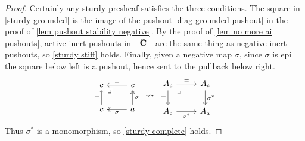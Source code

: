 \documentclass{amsart}
\makeatletter
\newcommand{\contr}{\mathbf{C}}
\newcommand*\wt[1]{\mathpalette\wthelper{#1}}
\newcommand*\wthelper[2]{%
        \hbox{\dimen@\accentfontxheight#1%
                \accentfontxheight#11.3\dimen@
                $\m@th#1\widetilde{#2}$%
                \accentfontxheight#1\dimen@
        }%
}
\newcommand*\accentfontxheight[1]{%
        \fontdimen5\ifx#1\displaystyle
                \textfont
        \else\ifx#1\textstyle
                \textfont
        \else\ifx#1\scriptstyle
                \scriptfont
        \else
                \scriptscriptfont
        \fi\fi\fi3
}
\newcommand{\Tcontr}{\wt\contr}
\newcommand{\drpullback}{\arrow[phantom]{dr}[very near start,description]{\lrcorner}}
\theoremstyle{definition}
\theoremstyle{noname}
\makeatother
\begin{document}
\begin{proof}
Certainly any sturdy presheaf satisfies the three conditions. 
The square in \eqref{sturdy grounded} is the image of the pushout \eqref{diag grounded pushout} in the proof of \cref{lem pushout stability negative}.
By the proof of \cref{lem no more ai pushouts}, active-inert pushouts in $\Tcontr$ are the same thing as negative-inert pushouts, so \eqref{sturdy stiff} holds. 
Finally, given a negative map $\sigma$, since $\sigma$ is epi the square below left is a pushout, hence sent to the pullback below right.
\[
\begin{tikzcd}
c \drpullback & c \lar[swap]{=} \\
c \uar["="] & a
\lar[two heads, "\sigma"] \uar[swap, two heads]{\sigma}
\end{tikzcd} 
\ \rightsquigarrow \
\begin{tikzcd}
A_c \rar{=} \dar[swap]{=} \drar[phantom, "\lrcorner"very near start] & A_c \dar{\sigma^*} \\
A_c \rar[swap]{\sigma^*} & A_a
\end{tikzcd}
\]
Thus $\sigma^*$ is a monomorphism, so \eqref{sturdy complete} holds.


\end{proof}
\end{document}
